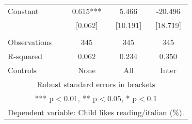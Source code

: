 \begin{tabular}{lccc}
Constant & 0.615*** & 5.466 & -20.496 \\
 & [0.062] & [10.191] & [18.719] \\
 &  &  &  \\
Observations & 345 & 345 & 345 \\
R-squared & 0.062 & 0.234 & 0.350 \\
 Controls & None & All & Inter \\ \hline
\multicolumn{4}{c}{ Robust standard errors in brackets} \\
\multicolumn{4}{c}{ *** p$<$0.01, ** p$<$0.05, * p$<$0.1} \\
\multicolumn{4}{c}{ Dependent variable: Child likes reading/italian (\%).} \\
\end{tabular}
